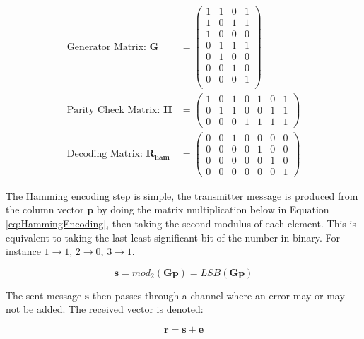 \documentclass[12pt,onecolumn,letterpaper]{article}
\begin{document}
\begin{align}
   \mbox{Generator Matrix: }\mathbf{G} &= \begin{pmatrix}
      1 & 1 & 0 & 1\\ 
      1 & 0 & 1 & 1\\ 
      1 & 0 & 0 & 0\\ 
      0 & 1 & 1 & 1\\ 
      0 & 1 & 0 & 0\\ 
      0 & 0 & 1 & 0\\ 
      0 & 0 & 0 & 1 \\
      \end{pmatrix} \\
   \mbox{Parity Check Matrix: }\mathbf{H} &= \begin{pmatrix}
      1 & 0 & 1 & 0 & 1 & 0 & 1\\ 
      0 & 1 & 1 & 0 & 0 & 1 & 1\\ 
      0 & 0 & 0 & 1 & 1 & 1 & 1
      \end{pmatrix} \\
   \mbox{Decoding Matrix: }\mathbf{R_{ham}} &= \begin{pmatrix}
      0 & 0 & 1 & 0 & 0 & 0 & 0\\ 
      0 & 0 & 0 & 0 & 1 & 0 & 0\\ 
      0 & 0 & 0 & 0 & 0 & 1 & 0\\ 
      0 & 0 & 0 & 0 & 0 & 0 & 1
      \end{pmatrix}
\end{align}

The Hamming encoding step is simple, the transmitter message is produced from the column vector $\mathbf{p}$ by doing the matrix multiplication below in Equation \ref{eq:HammingEncoding}, then taking the second modulus of each element. This is equivalent to taking the last least significant bit of the number in binary. For instance $1 \rightarrow 1$, $2 \rightarrow 0$, $3 \rightarrow 1$.

\begin{equation}
   \mathbf{s} = mod_2(\mathbf{Gp}) = LSB(\mathbf{Gp})
   \label{eq:HammingEncoding}
\end{equation}

The sent message $\mathbf{s}$ then passes through a channel where an error may or may not be added. The received vector is denoted:

\begin{equation}
   \mathbf{r} = \mathbf{s} + \mathbf{e}
\end{equation}
\end{document}
